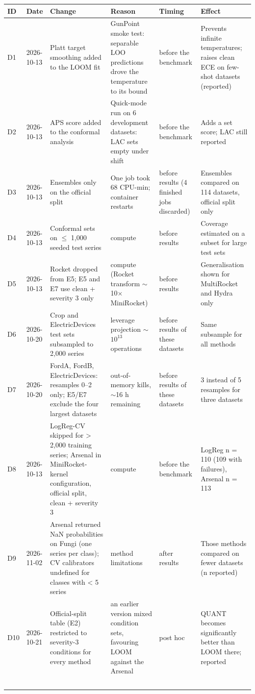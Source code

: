 \begin{longtable}{P{0.65cm}P{1.5cm}P{4.2cm}P{3.2cm}P{1.8cm}P{3.0cm}}
\toprule
ID & Date & Change & Reason & Timing & Effect \\
\midrule
\endhead
D1 & 2026-10-13 & Platt target smoothing added to the LOOM fit & GunPoint smoke test: separable LOO predictions drove the temperature to its bound & before the benchmark & Prevents infinite temperatures; raises clean ECE on few-shot datasets (reported) \\
D2 & 2026-10-13 & APS score added to the conformal analysis & Quick-mode run on 6 development datasets: LAC sets empty under shift & before the benchmark & Adds a set score; LAC still reported \\
D3 & 2026-10-13 & Ensembles only on the official split & One job took 68 CPU-min; container restarts & before results (4 finished jobs discarded) & Ensembles compared on 114 datasets, official split only \\
D4 & 2026-10-13 & Conformal sets on $\le$ 1,000 seeded test series & compute & before results & Coverage estimated on a subset for large test sets \\
D5 & 2026-10-13 & Rocket dropped from E5; E5 and E7 use clean + severity 3 only & compute (Rocket transform $\sim$10$\times$ MiniRocket) & before results & Generalisation shown for MultiRocket and Hydra only \\
D6 & 2026-10-20 & Crop and ElectricDevices test sets subsampled to 2,000 series & leverage projection $\sim$$10^{13}$ operations & before results of these datasets & Same subsample for all methods \\
D7 & 2026-10-20 & FordA, FordB, ElectricDevices: resamples 0--2 only; E5/E7 exclude the four largest datasets & out-of-memory kills, $\sim$16 h remaining & before results of these datasets & 3 instead of 5 resamples for three datasets \\
D8 & 2026-10-13 & LogReg-CV skipped for > 2,000 training series; Arsenal in MiniRocket-kernel configuration, official split, clean + severity 3 & compute & before the benchmark & LogReg n = 110 (109 with failures), Arsenal n = 113 \\
D9 & 2026-11-02 & Arsenal returned NaN probabilities on Fungi (one series per class); CV calibrators undefined for classes with < 5 series & method limitations & after results & Those methods compared on fewer datasets (n reported) \\
D10 & 2026-10-21 & Official-split table (E2) restricted to severity-3 conditions for every method & an earlier version mixed condition sets, favouring LOOM against the Arsenal & post hoc & QUANT becomes significantly better than LOOM there; reported \\
$$
\end{longtable}
